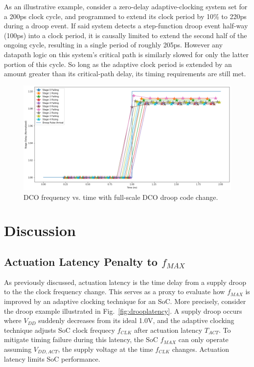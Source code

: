 \documentclass[twoside,9pt,journal,letterpage]{IEEEtran}
\begin{document}
As an illustrative example, consider a zero-delay adaptive-clocking system set for a 200ps clock cycle, and programmed to extend its clock period by 10\% to 220ps during a droop event. If said system detects a step-function droop event half-way (100ps) into a clock period, it is causally limited to extend the second half of the ongoing cycle, resulting in a single period of roughly 205ps. However any datapath logic on this system's critical path is similarly slowed for only the latter portion of this cycle. So long as the adaptive clock period is extended by an amount greater than its critical-path delay, its timing requirements are still met. 

\vspace{-10pt}
\begin{figure}[h]
	\centering
	\includegraphics[width=0.7\columnwidth]{stage-delay.png}
	\caption{DCO frequency vs. time with full-scale DCO droop code change.}
	\label{fig:dco_response}
\end{figure}

\section{Discussion}
\label{sec:discussion}
\subsection{Actuation Latency Penalty to $f_{MAX}$}
\label{sec:actuation_latency}

As previously discussed, actuation latency is the time delay from a supply droop to the the clock frequency change. This serves as a proxy to evaluate how $f_{MAX}$ is improved by an adaptive clocking technique for an SoC. More precisely, consider the droop example illustrated in Fig.\ \ref{fig:drooplatency}. A supply droop occurs where $V_{DD}$ suddenly decreases from its ideal 1.0V, and the adaptive clocking technique adjusts SoC clock frequecy $f_{CLK}$ after actuation latency $T_{ACT}$. To mitigate timing failure during this latency, the SoC $f_{MAX}$ can only operate assuming $V_{DD,ACT}$, the supply voltage at the time $f_{CLK}$ changes. Actuation latency limits SoC performance.
\end{document}
